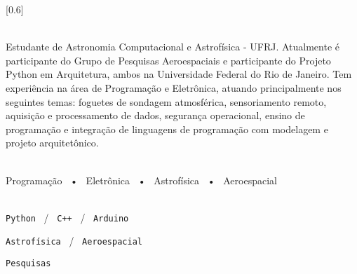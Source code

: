 \documentclass[darkhipster]{simplehipstercv}
\begin{document}
\setlength{\columnsep}{0.5cm}
[0.6]
\begin{paracol}{2}

\paracolbackgroundoptions



\footnotesize
{\setasidefontcolour
\flushleft
\begin{center}
\end{center}

\\[0.5em]

{\footnotesize
Estudante de Astronomia Computacional e Astrofísica - UFRJ. Atualmente é participante do Grupo de Pesquisas Aeroespaciais e participante do Projeto Python em Arquitetura, ambos na Universidade Federal do Rio de Janeiro. Tem experiência na área de Programação e Eletrônica, atuando principalmente nos seguintes temas: foguetes de sondagem atmosférica, sensoriamento remoto, aquisição e processamento de dados, segurança operacional, ensino de programação e integração de linguagens de programação com modelagem e projeto arquitetônico.}
\bigskip

 \\[0.5em]

Programação ~•~ Eletrônica ~•~ Astrofísica ~•~ Aeroespacial

\bigskip


\\[0.5em]

\texttt{Python} ~/~ \texttt{C++} ~/~ \texttt{Arduino}

\texttt{Astrofísica} ~/~ \texttt{Aeroespacial}

\texttt{Pesquisas}

\vspace{4em}


\phantom{turn the page}

\phantom{turn the page}
}
\switchcolumn


\end{paracol}
\end{document}
